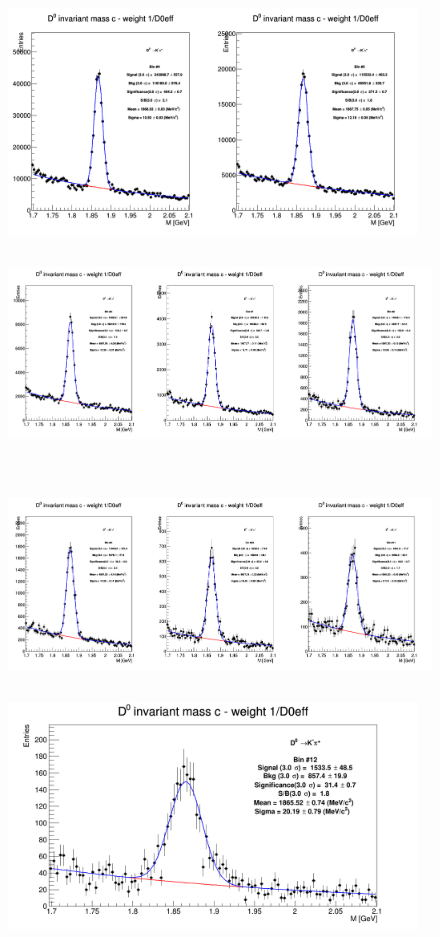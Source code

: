 \begin{enumerate}
\begin{figure}[!htp]
{\includegraphics[width=1\linewidth, height=6cm]{figures/Dzero/InvMassDistributions_Dzero_Bins4to5.png}}
{\includegraphics[width=1\linewidth, height=6cm]{figures/Dzero/InvMassDistributions_Dzero_Bins6to8.png}}
{\includegraphics[width=1\linewidth, height=6cm]{figures/Dzero/InvMassDistributions_Dzero_Bins9to11.png}}
{\includegraphics[width=0.8\linewidth, height=6cm]{figures/Dzero/InvMassDistributions_Dzero_Bins12to12.png}}


\end{figure}
\end{enumerate}
